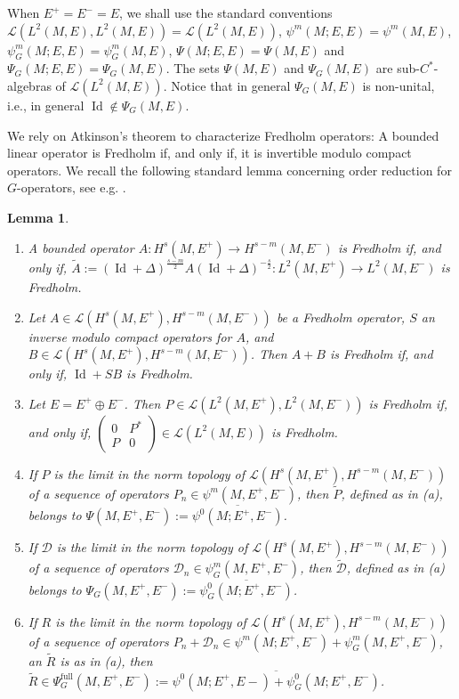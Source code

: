 \documentclass[11pt,a4paper]{amsart}
\newcommand{\maD}{\mathcal D}
\newcommand{\maL}{\mathcal L}
\newcommand\<{\langle}
\renewcommand\>{\rangle}
\newcommand{\oid}{\operatorname{Id}}
\newtheorem{lemma}[theorem]{Lemma}
\theoremstyle{definition}
\begin{document}
When $E^+=E^-=E$, we shall use the standard conventions $\maL(L^2(M,E),L^2(M,E)) = \maL(L^2(M,E))$,
$\psi^m(M;E,E)=\psi^m(M,E)$, $\psi^m_G(M;E,E)=\psi^m_G(M,E)$, 
$\Psi(M;E,E)=\Psi(M,E)$ and $\Psi_G(M;E,E)=\Psi_G(M,E)$.
The sets $\Psi(M,E)$ and $\Psi_G(M,E)$ 
are sub-$C^*$-algebras of $\maL(L^2(M,E))$. 
Notice that in general $\Psi_G(M,E)$ is non-unital, i.e., in general $\oid \not \in \Psi_G(M,E)$.

We rely on Atkinson's theorem to characterize Fredholm operators: 
A bounded linear operator is Fredholm if, and only if, it is invertible modulo compact operators.
We recall the following standard lemma concerning order reduction for $G$-operators, see e.g. \cite{BCLN1}.
\begin{lemma}
\begin{enumerate}\renewcommand\labelenumi{\rm (\alph{enumi})}
\item A bounded operator $A : H^s(M, E^+) \rightarrow H^{s-m}(M, E^-)$ is Fredholm if, and only if, 
$\tilde{A} := (\oid + \Delta)^{\frac{s-m}{2}} A (\oid + \Delta)^{-\frac{s}{2}} 
				: L^2(M, E^+) \rightarrow L^2(M, E^-)$ 
is Fredholm.
\item Let $A \in \maL(H^s(M,E^+),H^{s-m}(M,E^-))$ be a Fredholm operator, $S$ an inverse modulo compact operators for $A$, and  $B \in \maL(H^s(M,E^+), H^{s-m}(M,E^-))$.
Then
 $A+B$ is Fredholm if, and only if, $\oid + SB$ is Fredholm.  
\item Let  $E=E^+ \oplus E^-$. Then 
$P \in \maL(L^2(M,E^+),L^2(M,E^-))$ is Fredholm if, and only if, 
$\begin{pmatrix}
0& P^*\\
P&0
\end{pmatrix}\in \maL(L^2(M,E))$ is Fredholm.
\item  If $P$ is the limit in the norm
topology of $\maL(H^s(M, E^+), H^{s-m}(M, E^-))$ of a sequence of operators $P_n \in \psi^m(M, E^+,E^-)$, 
then $\tilde {P}$, defined as in (a), belongs to $\Psi(M,E^+,E^-):=\overline{\psi^0(M; E^+,E^-)}$.
\item If $\maD$ is the limit in the norm
topology of $\maL(H^s(M, E^+), H^{s-m}(M, E^-))$ of a sequence of operators $\maD_n \in \psi^m_G(M, E^+,E^-)$, 
then $\tilde{\maD}$, defined as in (a) belongs to $\Psi_G(M,E^+,E^-):=\overline{\psi^0_G(M; E^+,E^-)}$.
\item If $R$ is the limit in the norm
topology of $\maL(H^s(M, E^+), H^{s-m}(M, E^-))$ of a sequence of operators $P_n+\maD_n \in \psi^m(M;E^+,E^-)+\psi^m_G(M, E^+,E^-)$, an $\tilde R$ is as in (a), 
then $\tilde{R} \in \Psi_G^{\mathrm{full}}(M,E^+,E^-):=\overline{\psi^0(M;E^+,E-)+\psi^0_G(M; E^+,E^-)}$.
\end{enumerate}
\end{lemma} 
\end{document}
